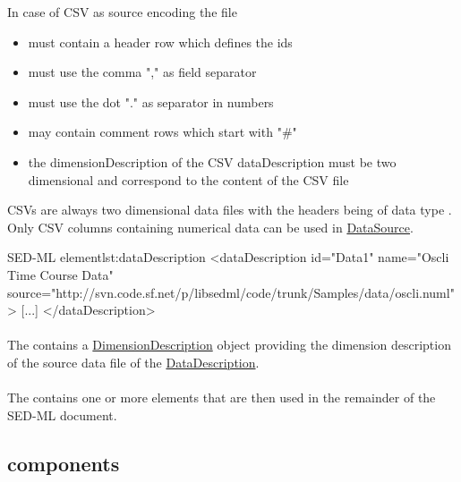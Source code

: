 In case of CSV as source encoding the file
\begin{itemize}
	\item must contain a header row which defines the ids
	\item must use the comma "," as field separator
	\item must use the dot "." as separator in numbers
	\item may contain comment rows which start with "\#"
	\item the dimensionDescription of the CSV dataDescription must be two dimensional and correspond to the content of the CSV file 
\end{itemize}
CSVs are always two dimensional data files with the headers being of data type \hyperref[type:numlsid]{}. Only CSV columns containing numerical data can be used in \hyperref[class:dataSource]{DataSource}.

\begin{myXmlLst}{SED-ML  element}{lst:dataDescription}
<dataDescription id="Data1" name="Oscli Time Course Data" 
	source="http://svn.code.sf.net/p/libsedml/code/trunk/Samples/data/oscli.numl" >
    [...]
</dataDescription>
\end{myXmlLst} 


\paragraph*{}
\label{sec:dimensionDescription}
The  contains a \hyperref[class:dimensionDescription]{DimensionDescription} object providing the dimension description of the source data file of the \hyperref[class:dataDescription]{DataDescription}.


\paragraph*{}
\label{sec:listOfDataSources}
The  contains one or more \SedDataSource elements that are then used in the remainder of the SED-ML document.

\subsection{ components}
\label{class:dataDescriptionComponents}


